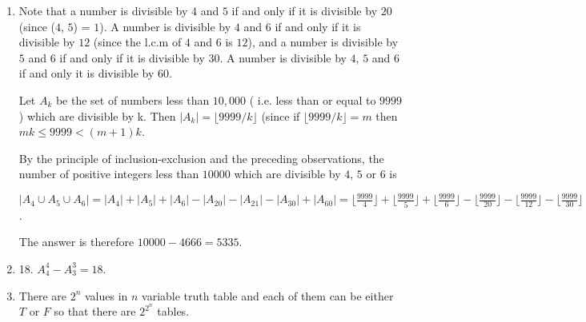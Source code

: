 \documentclass{../../cls/sig-alternate-05-2015}
\begin{document}
\begin{enumerate}
	Exactly $n/q$ of the elements of $S_n$ form the set $S_q$ which comprises factors of $p$ less than or equal to $n$ so $|S_q|=n/q$.
	
	Exactly $n/(pq)$ of the elements of $S_n$ form the intersection $S_p\cap S_q$ which comprises factors of $pq$ less than or equal to n so $|S_p \cap S_q|=n/(pq)$. 
	
	The set of numbers less than or equal to $n$ that contain neither factors of $p$ nor $q$ is the set $S_n \cap (S_p \cup S_q)$. 
	
	By inclusion-exclusion we have: 
	\begin{equation}
	\begin{aligned}
	|S_n \cap (S_p \cup S_q)| 
	=& |S_n| - (|S_p| + |S_q|) + |S_p \cap S_q|\\ 
	=& n - (n/p + n/q) + n/pq\\ 
	=& n(1 - 1/p - 1/q + 1/pq)\\
	=& n(1 - 1/p)(1 - 1/q)
	\end{aligned} 
	\end{equation}

	\item Note that a number is divisible by $4$ and $5$ if and only if it
	is divisible by $20$ (since ($4$, $5$) = $1$). A number is divisible by $4$ and $6$
	if and only if it is divisible by $12$ (since the l.c.m of $4$ and $6$ is $12$), and a number is divisible by $5$ and $6$ if and
	only if it is divisible by $30$. A number is divisible by $4$, $5$ and $6$ if and
	only it is divisible by $60$.
	
	Let $A_k$ be the set of numbers less than $10, 000$ ( i.e. less than or equal
	to $9999$ ) which are divisible by k. Then $|A_k| = \lfloor 9999/k \rfloor$ (since if
	$\lfloor 9999/k \rfloor =m$ then $mk \leq 9999 < (m + 1)k$.
	
	By the principle of inclusion-exclusion and the preceding observations,
	the number of positive integers less than $10000$ which are divisible
	by $4$, $5$ or $6$ is
	
	$|A_4\cup A_5 \cup A_6|=|A_4|+|A_5|+|A_6|-|A_{20}|-|A_{21}|-|A_{30}|+|A_{60}|
	=\lfloor \frac{9999}{4} \rfloor+ \lfloor \frac{9999}{5} \rfloor+\lfloor \frac{9999}{6} \rfloor-\lfloor \frac{9999}{20} \rfloor-\lfloor \frac{9999}{12} \rfloor-\lfloor \frac{9999}{30} \rfloor+\lfloor \frac{9999}{60} \rfloor=2499+1999+1666-499-833-333+166=4665$.
	
	The answer is therefore $10000-4666=5335$.
	
	\item 18. $A_4^4 -A_3^3=18.$ 
	
	\item There are $2^n$ values in $n$ variable truth table and each of them can be either $T$ or $F$ so that there are $2^{2^n}$ tables.
\end{enumerate}
\end{document}
